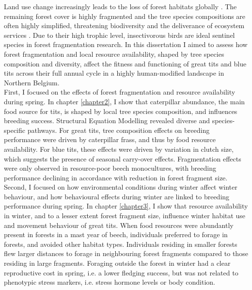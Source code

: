 \documentclass[10pt, twoside]{book} %
\begin{document}
Land use change increasingly leads to the loss of forest habitats globally \citep{Hansen2013}. The remaining forest cover is highly fragmented and the tree species compositions are often highly simplified, threatening biodiversity and the deliverance of ecosystem services \citep{Cardinale2012, Haddad2015}. Due to their high trophic level, insectivorous birds are ideal sentinel species in forest fragmentation research. In this dissertation I aimed to assess how forest fragmentation and local resource availability, shaped by tree species composition and diversity, affect the fitness and functioning of great tits and blue tits across their full annual cycle in a highly human-modified landscape in Northern Belgium.\\

First, I focused on the effects of forest fragmentation and resource availability during spring. In chapter \ref{chapter2}, I show that caterpillar abundance, the main food source for tits, is shaped by local tree species composition, and influences breeding success. Structural Equation Modelling revealed diverse and species-specific pathways. For great tits, tree composition effects on breeding performance were driven by caterpillar frass, and thus by food resource availability. For blue tits, these effects were driven by variation in clutch size, which suggests the presence of seasonal carry-over effects. Fragmentation effects were only observed in resource-poor beech monocultures, with breeding performance declining in accordance with reduction in forest fragment size.\\

Second, I focused on how environmental conditions during winter affect winter behaviour, and how behavioural effects during winter are linked to breeding performance during spring. In chapter \ref{chapter3}, I show that resource availability in winter, and to a lesser extent forest fragment size, influence winter habitat use and movement behaviour of great tits. When food resources were abundantly present in forests in a mast year of beech, individuals preferred to forage in forests, and avoided other habitat types. Individuals residing in smaller forests flew larger distances to forage in neighbouring forest fragments compared to those residing in large fragments. Foraging outside the forest in winter had a clear reproductive cost in spring, i.e. a lower fledging success, but was not related to phenotypic stress markers, i.e. stress hormone levels or body condition.\\
\end{document}
